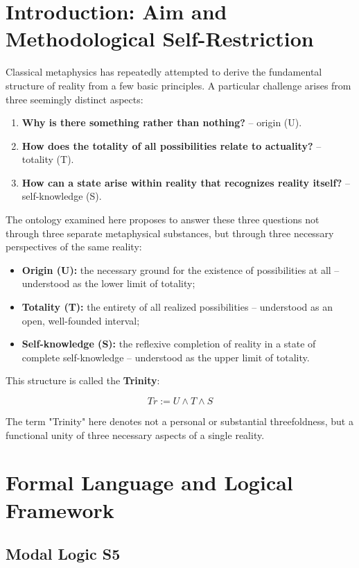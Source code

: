 \documentclass[
]{article}
\begin{document}
\section{Introduction: Aim and Methodological Self-Restriction}

Classical metaphysics has repeatedly attempted to derive the fundamental structure of reality from a few basic principles. A particular challenge arises from three seemingly distinct aspects:

\begin{enumerate}
\item \textbf{Why is there something rather than nothing?} – origin (U).
\item \textbf{How does the totality of all possibilities relate to actuality?} – totality (T).
\item \textbf{How can a state arise within reality that recognizes reality itself?} – self-knowledge (S).
\end{enumerate}

The ontology examined here proposes to answer these three questions not through three separate metaphysical substances, but through three necessary perspectives of the same reality:

\begin{itemize}
\item \textbf{Origin (U):} the necessary ground for the existence of possibilities at all – understood as the lower limit of totality;
\item \textbf{Totality (T):} the entirety of all realized possibilities – understood as an open, well-founded interval;
\item \textbf{Self-knowledge (S):} the reflexive completion of reality in a state of complete self-knowledge – understood as the upper limit of totality.
\end{itemize}

This structure is called the \textbf{Trinity}:

\[
Tr := U \land T \land S
\]

The term "Trinity" here denotes not a personal or substantial threefoldness, but a functional unity of three necessary aspects of a single reality.

\section{Formal Language and Logical Framework}

\subsection{Modal Logic S5}
\end{document}
